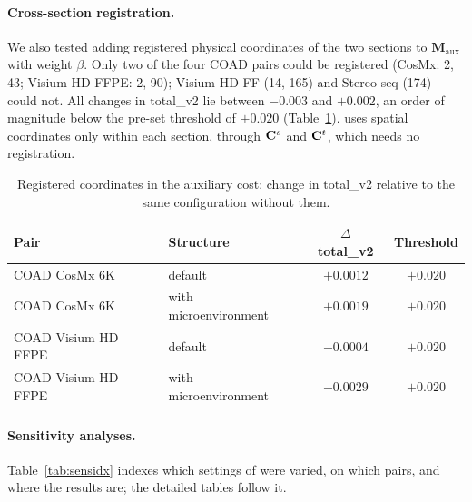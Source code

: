 \paragraph{Cross-section registration.} We also tested adding registered physical coordinates of the two sections to
$\mathbf{M}_{\mathrm{aux}}$ with weight $\beta$. Only two of the four COAD pairs could be registered (CosMx:
2\textdegree, 43\um; Visium HD FFPE: 2\textdegree, 90\um); Visium HD FF (14\textdegree, 165\um) and Stereo-seq
(174\textdegree) could not. All changes in total\_v2 lie between $-0.003$ and $+0.002$, an order of magnitude below
the pre-set threshold of $+0.020$ (Table~\ref{tab:registration}). \frost uses spatial coordinates only within each
section, through $\mathbf{C}^{s}$ and $\mathbf{C}^{t}$, which needs no registration.

\begin{table}[htbp]
\centering
\caption{Registered coordinates in the auxiliary cost: change in total\_v2 relative to the same configuration without
them.}
\label{tab:registration}
\begin{tabular}{@{}llcc@{}}
\toprule
Pair & Structure & $\Delta$ total\_v2 & Threshold \\
\midrule
COAD CosMx 6K      & default            & $+0.0012$ & $+0.020$ \\
COAD CosMx 6K      & with microenvironment & $+0.0019$ & $+0.020$ \\
COAD Visium HD FFPE & default           & $-0.0004$ & $+0.020$ \\
COAD Visium HD FFPE & with microenvironment & $-0.0029$ & $+0.020$ \\
\bottomrule
\end{tabular}
\end{table}

\paragraph{Sensitivity analyses.} Table~\ref{tab:sensidx} indexes which settings of \frost were varied, on which pairs,
and where the results are; the detailed tables follow it.

